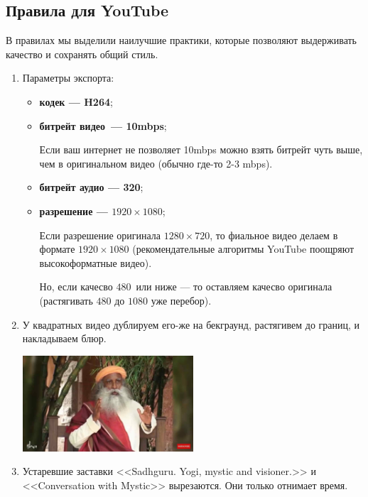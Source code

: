 \documentclass[
a4paper, %
12pt, %
article,
onecolumn, %
openany, %
]{memoir}
\begin{document}
\subsection{Правила для YouTube}
В правилах мы выделили наилучшие практики, которые позволяют выдерживать качество и сохранять общий стиль.
\begin{enumerate}
\item Параметры экспорта:
    \begin{itemize}
        \item \textbf{кодек --- H264};
        \item \textbf{битрейт видео~--- 10mbps};

        Если ваш интернет не позволяет 10mbps можно взять битрейт чуть выше, чем в 
        оригинальном видео (обычно где-то 2-3 mbps).

        \item \textbf{битрейт аудио --- 320};
        \item \textbf{разрешение --- $1920 \times 1080$};
       
        Если разрешение оригинала $1280 \times 720$,
            то фиальное видео делаем в формате
        $1920 \times 1080$ {\color{gray}(рекомендательные алгоритмы 
            YouTube поощряют 
        высокоформатные видео)}. 

        Но, если качесво $480$\ или ниже --- то оставляем 
        качесво оригинала {\color{gray}(растягивать $480$ до $1080$ уже перебор)}.
    \end{itemize}



\item У квадратных видео дублируем его-же на бекграунд, растягивем до границ, и накладываем блюр.

	\begin{center} \includegraphics[width=0.5\textwidth]{tooWide}  \end{center}

\item Устаревшие заставки <<Sadhguru. Yogi, mystic and visioner.>> и <<Conversation with Mystic>> вырезаются. {\color{gray}Они только отнимает время.}


\end{enumerate}
\end{document}
